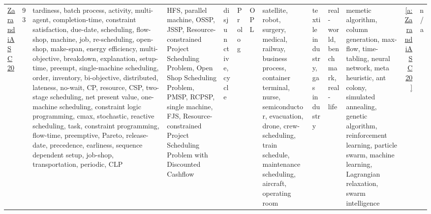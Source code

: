 {\begin{longtable}{>{\raggedright\arraybackslash}p{3cm}r>{\raggedright\arraybackslash}p{4cm}p{1.5cm}p{2cm}p{1.5cm}p{1.5cm}p{1.5cm}p{1.5cm}p{2cm}p{1.5cm}rr}
\href{../works/ZarandiASC20.pdf}{ZarandiASC20}~\cite{ZarandiASC20} & 93 & tardiness, batch process, activity, multi-agent, completion-time, constraint satisfaction, due-date, scheduling, flow-shop, machine, job, re-scheduling, open-shop, make-span, energy efficiency, multi-objective, breakdown, explanation, setup-time, preempt, single-machine scheduling, order, inventory, bi-objective, distributed, lateness, no-wait, CP, resource, CSP, two-stage scheduling, net present value, one-machine scheduling, constraint logic programming, cmax, stochastic, reactive scheduling, task, constraint programming, flow-time, preemptive, Pareto, release-date, precedence, earliness, sequence dependent setup, job-shop, transportation, periodic, CLP & HFS, parallel machine, OSSP, JSSP, Resource-constrained Project Scheduling Problem, Open Shop Scheduling Problem, PMSP, RCPSP, single machine, FJS, Resource-constrained Project Scheduling Problem with Discounted Cashflow & disjunctive, cycle & Prolog & OPL & satellite, robot, surgery, medical, railway, business process, container terminal, nurse, semiconductor, evacuation, drone, crew-scheduling, train schedule, maintenance scheduling, aircraft, operating room & textile industry, gas industry & real-world, benchmark, real-life & memetic algorithm, column generation, max-flow, time-tabling, neural network, meta heuristic, ant colony, simulated annealing, genetic algorithm, reinforcement learning, particle swarm, machine learning, Lagrangian relaxation, swarm intelligence & \ref{a:ZarandiASC20} & n/a\\
\end{longtable}
}

